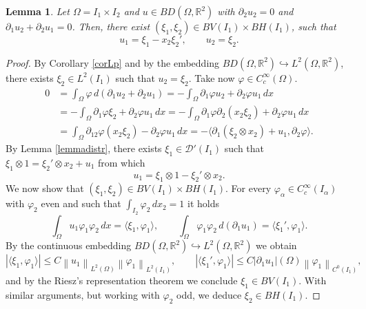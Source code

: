 \documentclass[a4, 11pt, reqno, final]{amsart}
\newcommand{\calD}{\mathcal{D}}
\newcommand{\bbR}{\mathbb{R}}
\newcommand{\n}[1]{\left\|#1\right\|}  %
\newcommand\embed{\hookrightarrow} %
\theoremstyle{plain}%
\newtheorem{lemma}[theorem]{Lemma}
\newcommand{\QED}{\hspace{1ex}\hfill$\blacksquare$\vspace{2ex}}
\begin{document}
	\begin{lemma}\label{lemmabd}
		Let $\Omega = I_1\times I_2$ and $u \in BD(\Omega,\bbR^2)$ with $\partial_2 u_2 = 0$ and $\partial_1 u_2 + \partial_2 u_1 = 0$. Then, there exist $(\xi_1, \xi_2) \in BV(I_1) \times BH(I_1)$, such that
		$$ u_{1} = \xi_1 -x_2\xi_2',\qquad
		u_2 = \xi_2.$$
	\end{lemma}
	\begin{proof}
		By Corollary \ref{corLp} and by the embedding $BD(\Omega,\bbR^2)\embed L^2(\Omega,\bbR^2)$, there exists $\xi_2 \in L^2(I_1)$ such that
		$u_2  = \xi_2 $.
		Take now $\varphi \in C_c^\infty(\Omega)$.
		$$ \begin{aligned}
			0 &= \int_\Omega \varphi \, d (\partial_1 u_2 + \partial_2 u_1)
			=-\int_\Omega \partial_1\varphi u_2 + \partial_2 \varphi u_1 \, dx\\
			&=-\int_\Omega \partial_1\varphi \xi_2 + \partial_2 \varphi u_1 \, dx
			=-\int_\Omega \partial_1\varphi \partial_2(x_2\xi_2) + \partial_2 \varphi u_1 \, dx\\
			&=\int_\Omega \partial_{12}\varphi (x_2\xi_2) - \partial_2 \varphi u_1 \, dx
			= -\langle \partial_1 (\xi_2 \otimes x_2) + u_1,\partial_2 \varphi \rangle.
		\end{aligned}$$
		By Lemma \ref{lemmadistr}, there exists $\xi_1 \in \calD'(I_1)$ such that
		$
		\xi_1 \otimes 1 = \xi_2' \otimes x_2 + u_1
		$
		from which
		$$
		u_1 = \xi_1 \otimes 1 - \xi_2' \otimes x_2.
		$$
		We now show that $(\xi_1, \xi_2) \in BV(I_1)\times BH(I_1)$. For every
		$\varphi_\alpha \in C_c^\infty(I_\alpha)$ with $\varphi_2$ even and such that $\int_{I_2} \varphi_2 \, dx_2 = 1$ it holds
		\begin{equation*}
			\int_\Omega u_1 \varphi_1 \varphi_2 \, dx = \langle \xi_1, \varphi_1 \rangle, \qquad
			\int_\Omega  \varphi_1 \varphi_2 \, d(\partial_1 u_1) = \langle \xi_1', \varphi_1 \rangle. \end{equation*}
		By the continuous embedding $BD(\Omega, \bbR^2) \embed L^2(\Omega, \bbR^2)$ we obtain
		$$|\langle \xi_1, \varphi_1 \rangle| \leq C \n{u_1}_{L^2(\Omega)} \n{\varphi_1}_{L^2(I_1)}, \qquad |\langle \xi_1', \varphi_1 \rangle| \leq C |\partial_1u_1|(\Omega)\n{\varphi_1}_{C^0(I_1)},$$
		and by the Riesz's representation theorem we conclude $\xi_1\in BV(I_1)$.
		With similar arguments, but working with $\varphi_2$ odd, we deduce $\xi_2 \in BH(I_1)$.
	\end{proof}
\end{document}
